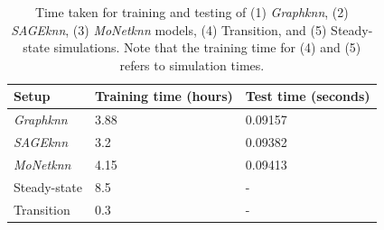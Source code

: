 \begin{table}[ht]
    \centering
    \caption{Time taken for training and testing of  (1) \textit{Graphknn}, (2) \textit{SAGEknn}, (3) \textit{MoNetknn} models, (4) Transition, and (5) Steady-state simulations. Note that the training time for (4) and (5) refers to simulation times.} 
    \label{t:times}
    \begin{tabular}{|l|l|l|}
    \hline
    \textbf{Setup}& \textbf{Training time (hours)} & \textbf{Test time (seconds)} \\
    \hline
    \textit{Graphknn} & 3.88 & 0.09157 \\
    \hline
    \textit{SAGEknn} & 3.2 & 0.09382 \\
    \hline
    \textit{MoNetknn} & 4.15 & 0.09413 \\
    \hline
    Steady-state& 8.5 & - \\
    \hline
    Transition & 0.3 & - \\
    \hline
    \end{tabular}
\end{table}
